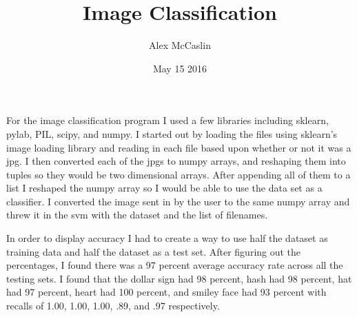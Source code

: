 \documentclass[12pt]{article}
\title{Image Classification}
\author{Alex McCaslin}
\date{May 15 2016}
\begin{document}
\maketitle
For the image classification program I used a few libraries including sklearn, pylab, PIL, scipy, and numpy. I started out by loading the files using sklearn's image loading library and reading in each file based upon whether or not it was a jpg. I then converted each of the jpgs to numpy arrays, and reshaping them into tuples so they would be two dimensional arrays. After appending all of them to a list I reshaped the numpy array so I would be able to use the data set as a classifier. I converted the image sent in by the user to the same numpy array and threw it in the svm with the dataset and the list of filenames.
	
	In order to display accuracy I had to create a way to use half the dataset as training data and half the dataset as a test set. After figuring out the percentages, I found there was a 97 percent average accuracy rate across all the testing sets. I found that the dollar sign had 98 percent, hash had 98 percent, hat had 97 percent, heart had 100 percent, and smiley face had 93 percent with recalls of 1.00, 1.00, 1.00, .89, and .97 respectively.
\end{document}

